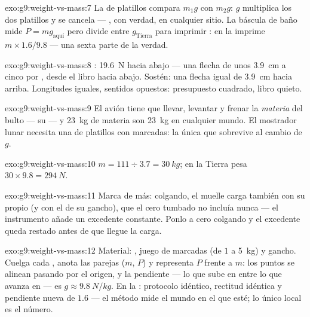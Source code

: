 \begin{solution}{exo:g9:weight-vs-mass:7}
La  de platillos compara $m_1 g$ con $m_2 g$: $g$ multiplica los
dos platillos y se cancela --- , con verdad, en cualquier
sitio. La báscula de baño mide $P = m g_{\text{aquí}}$ pero divide
entre $g_{\text{Tierra}}$ para imprimir : en la
 imprime $m \times 1.6/9.8$ --- una sexta parte de la verdad.
\end{solution}

\begin{solution}{exo:g9:weight-vs-mass:8}
: \qty{19.6}{N} hacia abajo --- una flecha de unos
\qty{3.9}{cm} a cinco  por , desde el
libro hacia abajo. Sostén: una flecha igual de \qty{3.9}{cm} hacia
arriba. Longitudes iguales, sentidos opuestos: presupuesto cuadrado,
libro quieto.
\end{solution}

\begin{solution}{exo:g9:weight-vs-mass:9}
El avión tiene que llevar, levantar y frenar la \emph{materia} del
bulto --- su  --- y \qty{23}{kg} de materia son
\qty{23}{kg} en cualquier mundo. El mostrador lunar necesita una
 de platillos con  marcadas: la única que sobrevive al
cambio de $g$.
\end{solution}

\begin{solution}{exo:g9:weight-vs-mass:10}
$m = 111 \div 3.7 = \qty{30}{kg}$; en la Tierra pesa $30 \times 9.8 =
\qty{294}{N}$.
\end{solution}

\begin{solution}{exo:g9:weight-vs-mass:11}
Marca de más: colgando, el muelle carga también con su propio
 (y con el de su gancho), que el cero tumbado no incluía nunca
--- el instrumento añade un excedente constante. Ponlo a cero colgando
y el excedente queda restado antes de que llegue la carga.
\end{solution}

\begin{solution}{exo:g9:weight-vs-mass:12}
Material: , juego de  marcadas (de $1$ a
\qty{5}{kg}) y gancho. Cuelga cada , anota las parejas ($m$,
$P$) y representa $P$ frente a $m$: los puntos se alinean pasando por
el origen, y la pendiente --- lo que sube en  entre lo que
avanza en  --- es $g \approx \qty{9.8}{N/kg}$. En la
: protocolo idéntico, rectitud idéntica y pendiente nueva de
$1.6$ --- el método mide el mundo en el que esté; lo único local
es el número.
\end{solution}


